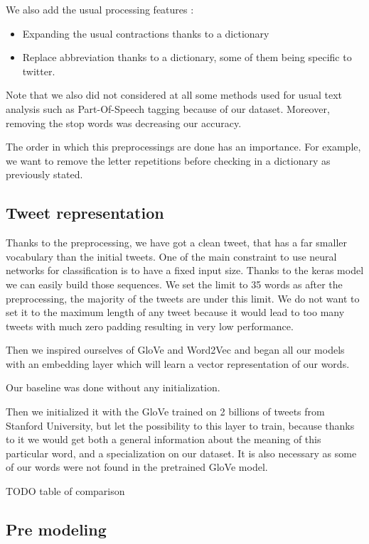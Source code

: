 \documentclass[10pt,conference,compsocconf]{IEEEtran}
\begin{document}
We also add the usual processing features : 
\begin{itemize}
    \item Expanding the usual contractions thanks to a dictionary
    \item Replace abbreviation thanks to a dictionary, some of them being specific to twitter.
\end{itemize}

Note that we also did not considered at all some methods used for usual text analysis such as Part-Of-Speech tagging because of our dataset. Moreover, removing the stop words was decreasing our accuracy.

The order in which this preprocessings are done has an importance. For example, we want to remove the letter repetitions before checking in a dictionary as previously stated.

\subsection{Tweet representation}

Thanks to the preprocessing, we have got a clean tweet, that has a far smaller vocabulary than the initial tweets. One of the main constraint to use neural networks for classification is to have a fixed input size. Thanks to the keras model we can easily build those sequences. We set the limit to 35 words as after the preprocessing, the majority of the tweets are under this limit. We do not want to set it to the maximum length of any tweet because it would lead to too many tweets with much zero padding resulting in very low performance.

Then we inspired ourselves of GloVe and Word2Vec and began all our models with an embedding layer which will learn a vector representation of our words.

Our baseline was done without any initialization.

Then we initialized it with the GloVe trained on 2 billions of tweets from Stanford University, but let the possibility to this layer to train, because thanks to it we would get both a general information about the meaning of this particular word, and a specialization on our dataset. It is also necessary as some of our words were not found in the pretrained GloVe model.


TODO table of comparison


\subsection{Pre modeling}
\end{document}

